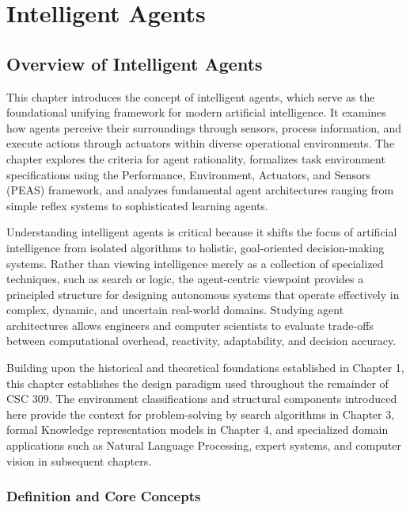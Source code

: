 \documentclass[12pt]{report}
\begin{document}
\pagestyle{plain}
\setcounter{chapter}{1}
\chapter{Intelligent Agents}

\section{Overview of Intelligent Agents}

This chapter introduces the concept of intelligent agents, which serve as the foundational unifying framework for modern artificial intelligence. It examines how agents perceive their surroundings through sensors, process information, and execute actions through actuators within diverse operational environments. The chapter explores the criteria for agent rationality, formalizes task environment specifications using the Performance, Environment, Actuators, and Sensors (PEAS) framework, and analyzes fundamental agent architectures ranging from simple reflex systems to sophisticated learning agents.

Understanding intelligent agents is critical because it shifts the focus of artificial intelligence from isolated algorithms to holistic, goal-oriented decision-making systems. Rather than viewing intelligence merely as a collection of specialized techniques, such as search or logic, the agent-centric viewpoint provides a principled structure for designing autonomous systems that operate effectively in complex, dynamic, and uncertain real-world domains. Studying agent architectures allows engineers and computer scientists to evaluate trade-offs between computational overhead, reactivity, adaptability, and decision accuracy.

Building upon the historical and theoretical foundations established in Chapter 1, this chapter establishes the design paradigm used throughout the remainder of CSC 309. The environment classifications and structural components introduced here provide the context for problem-solving by search algorithms in Chapter 3, formal Knowledge representation models in Chapter 4, and specialized domain applications such as Natural Language Processing, expert systems, and computer vision in subsequent chapters.

\subsection{Definition and Core Concepts}
\end{document}
